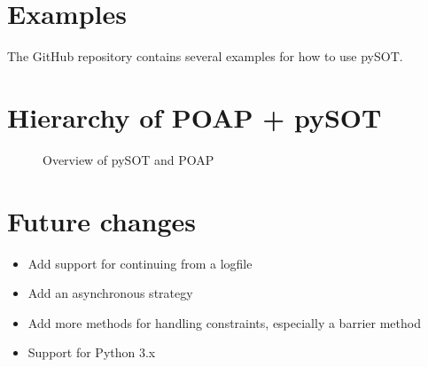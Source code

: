 \documentclass[]{article}
\begin{document}
\section{Examples}
The GitHub repository contains several examples for how to use pySOT.

\section{Hierarchy of POAP + pySOT}
\begin{figure}[!ht] 
	\centering
	\caption{Overview of pySOT and POAP} 
\end{figure}
\FloatBarrier

\section{Future changes}
\begin{itemize}
\item Add support for continuing from a logfile
\item Add an asynchronous strategy
\item Add more methods for handling constraints, especially a barrier method
\item Support for Python 3.x
\end{itemize}



\end{document}
